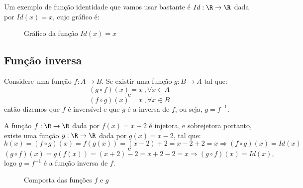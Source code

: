 Um exemplo de função identidade que vamos usar bastante é $Id: \R \rightarrow \R$ dada por $Id(x)= x$, cujo gráfico é:
\begin{figure}[H]
 \centering
    \caption{Gráfico da função $Id(x)=x$}
  \end{figure}

\subsection{Função inversa}

Considere uma função $f: A \rightarrow B$. Se existir uma função $g: B \rightarrow A$ tal que:
\[(g \circ f)(x)= x \ , \forall x \in A\]
\[ \text {e}\]
\[(f \circ g)(x)= x \ , \forall x \in B\]
então dizemos que $f$ é inversível e que $g$ é a inversa de $f$, ou seja, $g= f^{-1}$.

\begin{exem}
 A função $f: \R \rightarrow \R$ dada por $f(x)= x+2$ é injetora, e sobrejetora portanto, existe uma função $g: \R \rightarrow \R$ dada por $g(x)= x-2$, tal que:
 \[h(x)= (f \circ g)(x)= f(g(x))= (x-2) + 2= x-2+2= x \Rightarrow (f \circ g)(x)= Id(x)\]
 \[\text{e}\]
 \[(g \circ f)(x)= g(f(x))= (x+2) - 2= x+2-2= x \Rightarrow (g \circ f)(x)= Id(x) ,\]
 logo $g= f^{-1}$ é a função inversa de $f$.

 \begin{figure}[H]
 \centering
    \caption{Composta das funções $f$ e $g$}
  \end{figure}

\end{exem}



